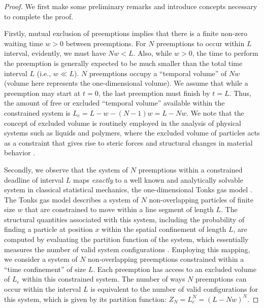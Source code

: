 \begin{proof} 
We first make some preliminary remarks and introduce concepts necessary to complete the proof. 

Firstly, mutual exclusion of preemptions implies that there is a finite non-zero waiting time $w>0$ between preemptions. 
For $N$ preemptions to occur within $L$ interval, evidently, we must have $N w < L$. Also, while $w >0$, the time to perform the preemption is generally expected to be much smaller than the total time interval $L$ (i.e., $w \ll L$).
$N$ preemptions occupy a ``temporal volume'' of $Nw$ (volume here represents the one-dimensional volume). We assume that while a preemption may start at $t=0$, the last preemption must finish by $t = L$. Thus, the amount of free or excluded ``temporal volume'' available within the constrained system is $L_e = L - w - (N-1)w = L - Nw$.
We note that the concept of excluded volume is routinely employed in the analysis of physical systems such as liquids and polymers, where the excluded volume of particles acts as a constraint that gives rise to steric forces and structural changes in material behavior \cite{krauth2006statistical,jing2015ionic,solis2013generating}. 

Secondly, we observe that the system of $N$ preemptions within a constrained deadline of interval $L$ maps \emph{exactly} to a well known and analytically solvable system in classical statistical mechanics, the one-dimensional Tonks gas model \cite{tonks}. The Tonks gas model describes a system of $N$ non-overlapping particles of finite size $w$ that are constrained to move within a line segment of length $L$. The structural quantities associated with this system, including the probability of finding a particle at position $x$ within the spatial confinement of length $L$, are computed by evaluating the partition function of the system, which essentially measures the number of valid system configurations \cite{krauth2006statistical}. 
Employing this mapping, we consider a system of $N$ non-overlapping preemptions constrained within a ``time confinement'' of size $L$. Each preemption has access to an excluded volume of $L_e$ within this constrained system. 
The number of ways $N$ preemptions can occur within the interval $L$ is equivalent to the number of valid configurations for this system, which is given by its partition function: $Z_N = L_e^N = (L- Nw)^N$.


\end{proof}

